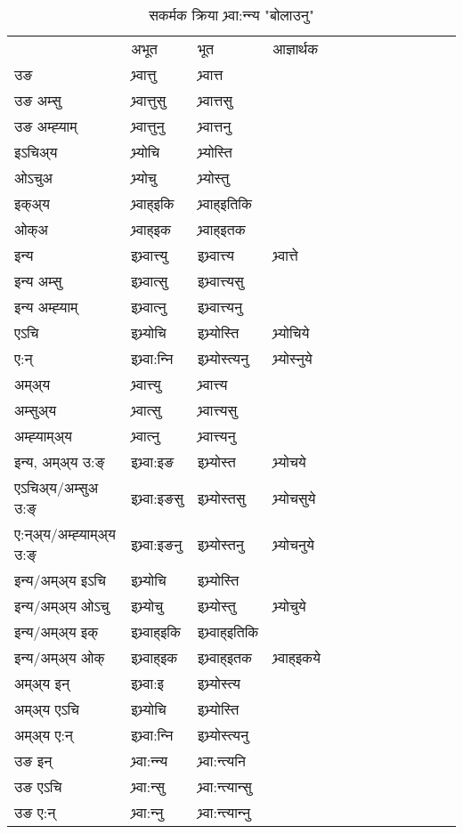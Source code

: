\begin{table}[H]
\centering
\caption{\label{ott.vt} सकर्मक क्रिया  भ्र्वा:न्‍न्य  "बोलाउनु"  }
\begin{tabular}{l|l|l|l|l|l|l|l|l|l|l|l|l}  \toprule
&अभूत & भूत & आज्ञार्थक \\ 
उङ &भ्र्वात्तु &भ्र्वात्त \\ 
उङ अम्सु&भ्र्वात्तुसु &भ्र्वात्तसु \\ 
उङ अम्ह्‍याम्&भ्र्वात्तुनु &भ्र्वात्तनु \\ 
इऽचिअ्य &भ्र्योचि &भ्र्योस्ति   \\ 
ओऽचुअ        &भ्र्योचु &भ्र्योस्तु   \\ 
इक्अ्य&भ्र्वाह्इकि &भ्र्वाह्इतिकि   \\ 
ओक्अ &भ्र्वाह्इक &भ्र्वाह्इतक   \\ 
इन्य & इभ्र्वात्त्यु  & इभ्र्वात्त्य &भ्र्वात्ते  \\ 
इन्य अम्सु& इभ्र्वात्सु  & इभ्र्वात्त्यसु   \\ 
इन्य अम्ह्‍याम्& इभ्र्वात्‍नु  & इभ्र्वात्त्यनु   \\ 
एऽचि & इभ्र्योचि & इभ्र्योस्ति &भ्र्योचिये    \\ 
ए:न् & इभ्र्वा:न्‍नि  & इभ्र्योस्त्यनु &भ्र्योस्‍नुये  \\ 
अम्अ्य & भ्र्वात्त्यु  & भ्र्वात्त्य  \\ 
अम्सुअ्य & भ्र्वात्सु & भ्र्वात्त्यसु  \\ 
अम्ह्‍याम्अ्य & भ्र्वात्‍नु  & भ्र्वात्त्यनु \\ 
\midrule
इन्य, अम्अ्य उ:ङ्‌ &इभ्र्वा:इङ &इभ्र्योस्त &भ्र्योचये \\ 
एऽचिअ्य/अम्सुअ उ:ङ्‌ &इभ्र्वा:इङसु &इभ्र्योस्तसु &भ्र्योचसुये \\ 
ए:न्अ्य/अम्ह्‍याम्अ्य उ:ङ्‌ &इभ्र्वा:इङनु &इभ्र्योस्तनु &भ्र्योचनुये \\ 
इन्य/अम्अ्य इऽचि &इभ्र्योचि &इभ्र्योस्ति    \\ 
इन्य/अम्अ्य ओऽचु &इभ्र्योचु &इभ्र्योस्तु  &भ्र्योचुये  \\ 
इन्य/अम्अ्य इक् &इभ्र्वाह्इकि &इभ्र्वाह्इतिकि   \\ 
इन्य/अम्अ्य ओक् &इभ्र्वाह्इक &इभ्र्वाह्इतक  &भ्र्वाह्इकये  \\ 
अम्अ्य इन् & इभ्र्वा:इ & इभ्र्योस्त्य   \\ 
अम्अ्य एऽचि & इभ्र्योचि & इभ्र्योस्ति    \\ 
अम्अ्य ए:न् & इभ्र्वा:न्‍नि  & इभ्र्योस्त्यनु  \\ 
\midrule
उङ इन् & भ्र्वा:न्‍न्य  & भ्र्वा:न्त्यनि  \\ 
उङ एऽचि & भ्र्वा:न्सु  & भ्र्वा:न्त्यान्सु   \\ 
उङ ए:न्& भ्र्वा:न्‍नु  & भ्र्वा:न्त्यान्‍नु   \\ 
\bottomrule
\end{tabular}
\end{table}


